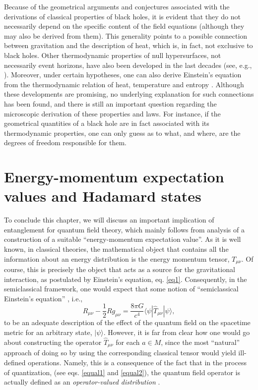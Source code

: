 \documentclass[
12pt,		%
openright,	%
twoside,  %
a4paper,			%
chapter=TITLE,		%
english,			%
french,				%
spanish,			%
brazil				%
]{USPSC-classe/USPSC}
\begin{document}
Because of the geometrical arguments and conjectures associated with the derivations of classical properties of black holes, it is evident that they do not necessarily depend on the specific content of the field equations (although they may also be derived from them). This generality points to a possible connection between gravitation and the description of heat, which is, in fact, not exclusive to black holes. Other thermodynamic properties of null hypersurfaces, not necessarily event horizons, have also been developed in the last decades (see, e.g., \cite{Gibbons1977,Hawking1995, Jacobson2003, Padmanabhan2010,Guedens2012}). Moreover, under certain hypotheses, one can also derive Einstein's equation from the thermodynamic relation of heat, temperature and entropy \cite{Jacobson1995}. Although these developments are promising, no underlying explanation for such connections has been found, and there is still an important question regarding the microscopic derivation of these properties and laws. For instance, if the geometrical quantities of a black hole are in fact associated with its thermodynamic properties, one can only guess as to what, and where, are the degrees of freedom responsible for them.

\section{Energy-momentum expectation values and Hadamard states}\label{hadmard}

To conclude this chapter, we will discuss an important implication of entanglement for quantum field theory, which mainly follows from analysis of a construction of a suitable ``energy-momentum expectation value''. As it is well known, in classical theories, the mathematical object that contains all the information about an energy distribution is the energy momentum tensor, $T_{\mu\nu}$. Of course, this is precisely the object that acts as a source for the gravitational interaction, as postulated by Einstein's equation, eq. \ref{eq1}. Consequently, in the semiclassical framework, one would expect that some notion of ``semiclassical Einstein's equation'' \cite{Wald1994}, i.e.,
\begin{equation}\label{semiefe}
    R_{\mu\nu}-\frac{1}{2}Rg_{\mu\nu}=\frac{8\pi G}{c^4}\langle \psi|\hat{T}_{\mu\nu}|\psi\rangle,
\end{equation}
to be an adequate description of the effect of the quantum field on the spacetime metric for an arbitrary state, $|\psi\rangle$. However, it is far from clear how one would go about constructing the operator $\hat{T}_{\mu\nu}$ for each $a\in M$, since the most ``natural'' approach of doing so by using the corresponding classical tensor would yield ill-defined operations. Namely, this is a consequence of the fact that in the process of quantization, (see eqs. \ref{equal1} and \ref{equal2}), the quantum field operator is actually defined as an \textit{operator-valued distribution} \cite{Wald1994,Wald1984}.
\end{document}
